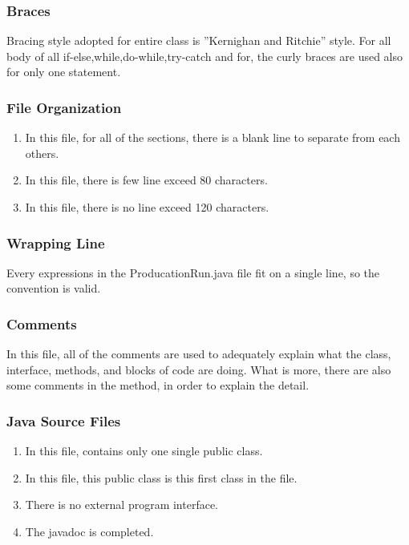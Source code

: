 \documentclass{article}
\begin{document}
  \subsubsection{Braces}
  Bracing style adopted for entire class is ”Kernighan and Ritchie” style.\newline 
  For all body of all if-else,while,do-while,try-catch and for, the curly braces are used also for only one statement.
  
  \subsubsection{File Organization}
  \begin{enumerate}
  	\item In this file, for all of the sections, there is a blank line to separate from each others.
  	\item In this file, there is few line exceed 80 characters.
  	\item In this file, there is no line exceed 120 characters.
  \end{enumerate}
  
  \subsubsection{Wrapping Line}
  Every expressions in the ProducationRun.java file fit on a single line, so the convention is valid.
  
  \subsubsection{Comments}
  In this file, all of the comments are used to adequately explain what the class, interface, methods, and blocks of code are doing.
  What is more, there are also some comments in the method, in order to explain the detail.
  
  \subsubsection{Java Source Files}
  \begin{enumerate}
  	\item In this file, contains only one single public class. \newline
  	\item In this file, this public class is this first class in the file. \newline
  	\item There is no external program interface. \newline
  	\item The javadoc is completed.
  \end{enumerate}
  
\end{document}
